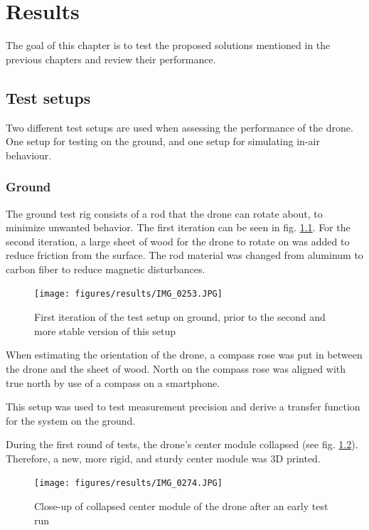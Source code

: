\chapter{Results}\label{chap:results}
The goal of this chapter is to test the proposed solutions mentioned in the previous chapters and review their performance. 
\section{Test setups}
Two different test setups are used when assessing the performance of the drone. One setup for testing on the ground, and one setup for simulating in-air behaviour. 

\subsection{Ground}
The ground test rig consists of a rod that the drone can rotate about, to minimize unwanted behavior. The first iteration can be seen in fig. \ref{fig:testsetup_ground}. For the second iteration, a large sheet of wood for the drone to rotate on was added to reduce friction from the surface. The rod material was changed from aluminum to carbon fiber to reduce magnetic disturbances.
\begin{figure}[h]
    \centering
    \texttt{[image: figures/results/IMG\_0253.JPG]}
    \caption{First iteration of the test setup on ground, prior to the second and more stable version of this setup}
    \label{fig:testsetup_ground}
\end{figure}

When estimating the orientation of the drone, a compass rose was put in between the drone and the sheet of wood. North on the compass rose was aligned with true north by use of a compass on a smartphone. 

This setup was used to test measurement precision and derive a transfer function for the system on the ground. 

During the first round of tests, the drone's center module collapsed (see fig. \ref{fig:dronecollapse}). Therefore, a new, more rigid, and sturdy center module was 3D printed.

\begin{figure}[h]
    \centering
    \texttt{[image: figures/results/IMG\_0274.JPG]}
    \caption{Close-up of collapsed center module of the drone after an early test run}
    \label{fig:dronecollapse}
\end{figure}
\FloatBarrier


